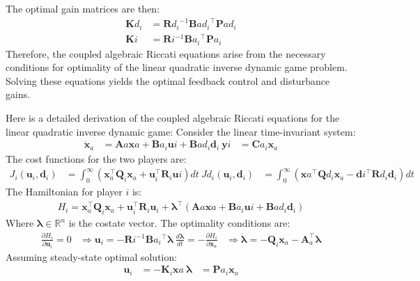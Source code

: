 \documentclass[3p]{elsarticle}
\begin{document}
The optimal gain matrices are then:
\begin{align}
\mathbf{K}{d_i} &= \mathbf{R}{d_i}^{-1}\mathbf{B}{a{d_i}}^\top \mathbf{P}{a{d_i}} \\
\mathbf{K}i &= \mathbf{R}i^{-1}\mathbf{B}{a_i}^\top \mathbf{P}{a_i}
\end{align}
Therefore, the coupled algebraic Riccati equations arise from the necessary conditions for optimality of the linear quadratic inverse dynamic game problem. Solving these equations yields the optimal feedback control and disturbance gains.

Here is a detailed derivation of the coupled algebraic Riccati equations for the linear quadratic inverse dynamic game:
Consider the linear time-invariant system:
\begin{align}
\dot{\mathbf{x}}_a &= \mathbf{A}a\mathbf{x}a + \mathbf{B}{a_i}\mathbf{u}i + \mathbf{B}{a{d_i}}\mathbf{d}_i \
\mathbf{y}i &= \mathbf{C}{a_i}\mathbf{x}_a
\end{align}
The cost functions for the two players are:
\begin{align}
J_i(\mathbf{u}_i, \mathbf{d}_i) &= \int_0^{\infty} \left(\mathbf{x}_a^\top \mathbf{Q}_i \mathbf{x}_a + \mathbf{u}_i^\top \mathbf{R}_i \mathbf{u}i \right) dt \
J{d_i}(\mathbf{u}_i, \mathbf{d}_i) &= \int_0^{\infty} \left(\mathbf{x}a^\top \mathbf{Q}{d_i} \mathbf{x}_a - \mathbf{d}i^\top \mathbf{R}{d_i} \mathbf{d}_i\right) dt
\end{align}
The Hamiltonian for player $i$ is:
\begin{align}
H_i = \mathbf{x}_a^\top \mathbf{Q}_i \mathbf{x}_a + \mathbf{u}_i^\top \mathbf{R}_i \mathbf{u}_i + \boldsymbol{\lambda}^\top\left(\mathbf{A}a\mathbf{x}a + \mathbf{B}{a_i}\mathbf{u}i + \mathbf{B}{a{d_i}}\mathbf{d}_i\right)
\end{align}
Where $\boldsymbol{\lambda} \in \mathbb{R}^n$ is the costate vector.
The optimality conditions are:
\begin{align}
\frac{\partial H_i}{\partial \mathbf{u}_i} = 0 &\Rightarrow \mathbf{u}_i = -\mathbf{R}i^{-1}\mathbf{B}{a_i}^\top\boldsymbol{\lambda} \
\frac{d\boldsymbol{\lambda}}{dt} = -\frac{\partial H_i}{\partial \mathbf{x}_a} &\Rightarrow \dot{\boldsymbol{\lambda}} = -\mathbf{Q}_i\mathbf{x}_a - \mathbf{A}_a^\top\boldsymbol{\lambda}
\end{align}
Assuming steady-state optimal solution:
\begin{align}
\mathbf{u}_i &= -\mathbf{K}_i \mathbf{x}a \
\boldsymbol{\lambda} &= \mathbf{P}{a_i}\mathbf{x}_a
\end{align}
\end{document}
